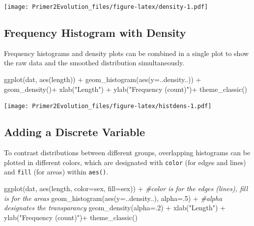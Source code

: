 \documentclass[
]{book}
\newenvironment{Shaded}{\begin{snugshade}}{\end{snugshade}}
\newcommand{\AttributeTok}[1]{\textcolor[rgb]{0.77,0.63,0.00}{#1}}
\newcommand{\CommentTok}[1]{\textcolor[rgb]{0.56,0.35,0.01}{\textit{#1}}}
\newcommand{\DecValTok}[1]{\textcolor[rgb]{0.00,0.00,0.81}{#1}}
\newcommand{\FunctionTok}[1]{\textcolor[rgb]{0.00,0.00,0.00}{#1}}
\newcommand{\NormalTok}[1]{#1}
\newcommand{\SpecialCharTok}[1]{\textcolor[rgb]{0.00,0.00,0.00}{#1}}
\newcommand{\StringTok}[1]{\textcolor[rgb]{0.31,0.60,0.02}{#1}}
\begin{document}
\texttt{[image: Primer2Evolution\_files/figure-latex/density-1.pdf]}

\hypertarget{frequency-histogram-with-density}{%
\subsection{Frequency Histogram with Density}\label{frequency-histogram-with-density}}

Frequency histograms and density plots can be combined in a single plot to show the raw data and the smoothed distribution simultaneously.

\begin{Shaded}
\begin{Highlighting}[]
\FunctionTok{ggplot}\NormalTok{(dat, }\FunctionTok{aes}\NormalTok{(length)) }\SpecialCharTok{+}
    \FunctionTok{geom\_histogram}\NormalTok{(}\FunctionTok{aes}\NormalTok{(}\AttributeTok{y=}\NormalTok{..density..)) }\SpecialCharTok{+}
    \FunctionTok{geom\_density}\NormalTok{()}\SpecialCharTok{+}
    \FunctionTok{xlab}\NormalTok{(}\StringTok{"Length"}\NormalTok{) }\SpecialCharTok{+}
    \FunctionTok{ylab}\NormalTok{(}\StringTok{"Frequency (count)"}\NormalTok{)}\SpecialCharTok{+}
    \FunctionTok{theme\_classic}\NormalTok{()}
\end{Highlighting}
\end{Shaded}

\texttt{[image: Primer2Evolution\_files/figure-latex/histdens-1.pdf]}

\hypertarget{adding-a-discrete-variable}{%
\subsection{Adding a Discrete Variable}\label{adding-a-discrete-variable}}

To contrast distributions between different groups, overlapping histograms can be plotted in different colors, which are designated with \texttt{color} (for edges and lines) and \texttt{fill} (for areas) within \texttt{aes()}.

\begin{Shaded}
\begin{Highlighting}[]
\FunctionTok{ggplot}\NormalTok{(dat, }\FunctionTok{aes}\NormalTok{(length, }\AttributeTok{color=}\NormalTok{sex, }\AttributeTok{fill=}\NormalTok{sex)) }\SpecialCharTok{+} \CommentTok{\#color is for the edges (lines), fill is for the areas}
    \FunctionTok{geom\_histogram}\NormalTok{(}\FunctionTok{aes}\NormalTok{(}\AttributeTok{y=}\NormalTok{..density..), }\AttributeTok{alpha=}\NormalTok{.}\DecValTok{5}\NormalTok{) }\SpecialCharTok{+} \CommentTok{\#alpha designates the transparancy}
    \FunctionTok{geom\_density}\NormalTok{(}\AttributeTok{alpha=}\NormalTok{.}\DecValTok{2}\NormalTok{) }\SpecialCharTok{+} 
    \FunctionTok{xlab}\NormalTok{(}\StringTok{"Length"}\NormalTok{) }\SpecialCharTok{+}
    \FunctionTok{ylab}\NormalTok{(}\StringTok{"Frequency (count)"}\NormalTok{)}\SpecialCharTok{+}
    \FunctionTok{theme\_classic}\NormalTok{()}
\end{Highlighting}
\end{Shaded}
\end{document}
